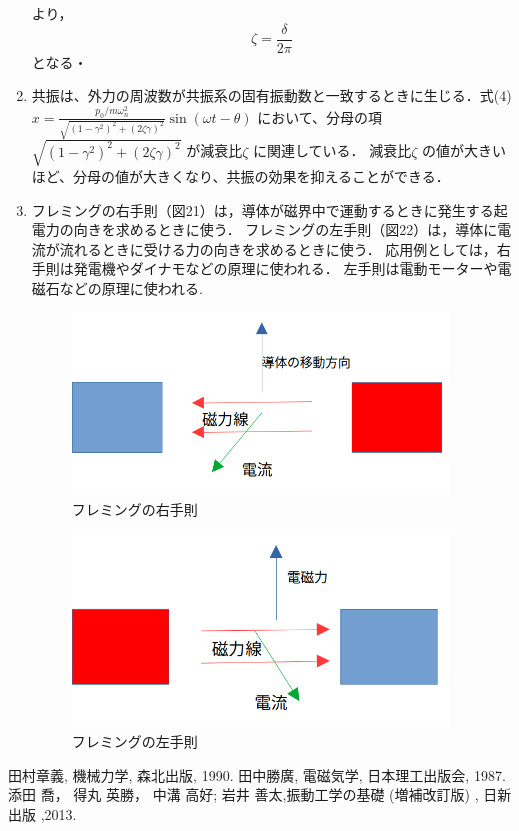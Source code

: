 \documentclass[a4paper,10.5pt]{jsarticle}
\begin{document}
\begin{enumerate}
  より，
  \begin{equation}
    \zeta = {\dfrac{\delta}{{2\pi}}}
  \end{equation}
  となる・
  \item 共振は、外力の周波数が共振系の固有振動数と一致するときに生じる．式(4)
    $x = \frac{{p_0/m\omega_n^2}}{{\sqrt{{(1-\gamma^2)^2+(2\zeta\gamma)^2}}}}\sin(\omega{t}-\theta)$
  において、分母の項 $\sqrt{{(1-\gamma^2)^2+(2\zeta\gamma)^2}} $
  が減衰比$\zeta$ に関連している．
  減衰比$\zeta$ の値が大きいほど、分母の値が大きくなり、共振の効果を抑えることができる．
  \item 
  フレミングの右手則（図21）は，導体が磁界中で運動するときに発生する起電力の向きを求めるときに使う．
  フレミングの左手則（図22）は，導体に電流が流れるときに受ける力の向きを求めるときに使う．
  応用例としては，右手則は発電機やダイナモなどの原理に使われる．
  左手則は電動モーターや電磁石などの原理に使われる. 
  \newpage
  \begin{figure}[h]
    \centering
    \includegraphics[width=10cm]{12.png}
    \caption{フレミングの右手則}
  \end{figure}
  \begin{figure}[h]
    \centering
    \includegraphics[width=10cm]{13.png}
    \caption{フレミングの左手則}
  \end{figure}
\end{enumerate}

\begin{thebibliography}{20}
  \bibitem{} 
  田村章義, 機械力学, 森北出版, 1990.
  \bibitem{}
  田中勝廣, 電磁気学, 日本理工出版会, 1987.
  \bibitem{}
  添田 喬， 得丸 英勝， 中溝 高好; 岩井 善太,振動工学の基礎 (増補改訂版)  , 日新出版 ,2013. 
 \end{thebibliography}
\end{document}
